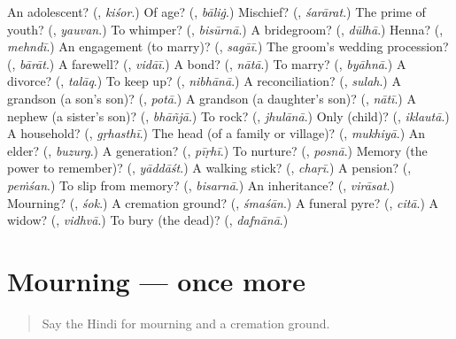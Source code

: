 \begin{tcolorbox}[breakable,colback=teal!4,colframe=teal!35!black,title={Before you move on}]
An adolescent? (\textbf{}, \emph{kiśor}.) Of age? (\textbf{}, \emph{bāliġ}.) Mischief? (\textbf{}, \emph{śarārat}.) The prime of youth? (\textbf{}, \emph{yauvan}.) To whimper? (\textbf{}, \emph{bisūrnā}.) A bridegroom? (\textbf{}, \emph{dūlhā}.) Henna? (\textbf{}, \emph{mehndī}.) An engagement (to marry)? (\textbf{}, \emph{sagāī}.) The groom's wedding procession? (\textbf{}, \emph{bārāt}.) A farewell? (\textbf{}, \emph{vidāī}.) A bond? (\textbf{}, \emph{nātā}.) To marry? (\textbf{}, \emph{byāhnā}.) A divorce? (\textbf{}, \emph{talāq}.) To keep up? (\textbf{}, \emph{nibhānā}.) A reconciliation? (\textbf{}, \emph{sulah}.) A grandson (a son's son)? (\textbf{}, \emph{potā}.) A grandson (a daughter's son)? (\textbf{}, \emph{nātī}.) A nephew (a sister's son)? (\textbf{}, \emph{bhāñjā}.) To rock? (\textbf{}, \emph{jhulānā}.) Only (child)? (\textbf{}, \emph{iklautā}.) A household? (\textbf{}, \emph{gṛhasthī}.) The head (of a family or village)? (\textbf{}, \emph{mukhiyā}.) An elder? (\textbf{}, \emph{buzurg}.) A generation? (\textbf{}, \emph{pīṛhī}.) To nurture? (\textbf{}, \emph{posnā}.) Memory (the power to remember)? (\textbf{}, \emph{yāddāśt}.) A walking stick? (\textbf{}, \emph{chaṛī}.) A pension? (\textbf{}, \emph{peṁśan}.) To slip from memory? (\textbf{}, \emph{bisarnā}.) An inheritance? (\textbf{}, \emph{virāsat}.) Mourning? (\textbf{}, \emph{śok}.) A cremation ground? (\textbf{}, \emph{śmaśān}.) A funeral pyre? (\textbf{}, \emph{citā}.) A widow? (\textbf{}, \emph{vidhvā}.) To bury (the dead)? (\textbf{}, \emph{dafnānā}.)
\end{tcolorbox}
\section[(dialogue)]{Mourning — once more}

\label{lesson:HI-R505-review-final-505}



\begin{quote}
Say the Hindi for mourning and a cremation ground.
\end{quote}

